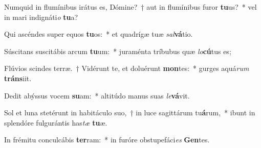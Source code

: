 \item Numquid in flumínibus irátus es, Dómine?~† aut in flumínibus furor \textbf{tu}us?~* vel in mari indignáti\textit{o} \textbf{tu}a?
\item Qui ascéndes super equos \textbf{tu}os:~* et quadrígæ tuæ \textit{sal}\textbf{vá}tio.
\item Súscitans suscitábis arcum \textbf{tu}um:~* juraménta tríbubus quæ \textit{lo}\textbf{cú}tus es;
\item Flúvios scindes terræ.~† Vidérunt te, et doluérunt \textbf{mon}tes:~* gurges aquá\textit{rum} \textbf{tráns}iit.
\item Dedit abýssus vocem \textbf{su}am:~* altitúdo manus suas \textit{le}\textbf{vá}vit.
\item Sol et luna stetérunt in habitáculo suo,~† in luce sagittárum tu\textbf{á}rum,~* ibunt in splendóre fulgurántis has\textit{tæ} \textbf{tu}æ.
\item In frémitu conculcábis \textbf{ter}ram:~* in furóre obstupefáci\textit{es} \textbf{Gen}tes.
